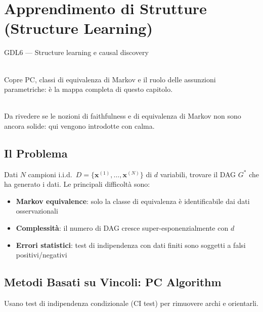 \chapter{Apprendimento di Strutture (Structure Learning)}
\label{ch:structure_learning}

\begin{risorsevideo}{GDL6 — Structure learning e causal discovery}

\medskip
{}\\
Copre PC, classi di equivalenza di Markov e il ruolo delle assunzioni parametriche: è la mappa completa di questo capitolo.

\medskip
{}\\
Da rivedere se le nozioni di faithfulness e di equivalenza di Markov non sono ancora solide: qui vengono introdotte con calma.
\end{risorsevideo}

\section{Il Problema}

Dati $N$ campioni i.i.d.\ $D = \{\mathbf{x}^{(1)}, \ldots, \mathbf{x}^{(N)}\}$ di $d$ variabili, trovare il DAG $G^*$ che ha generato i dati. Le principali difficoltà sono:

\begin{itemize}
    \item \textbf{Markov equivalence}: solo la classe di equivalenza è identificabile dai dati osservazionali
    \item \textbf{Complessità}: il numero di DAG cresce super-esponenzialmente con $d$
    \item \textbf{Errori statistici}: test di indipendenza con dati finiti sono soggetti a falsi positivi/negativi
\end{itemize}

\section{Metodi Basati su Vincoli: PC Algorithm}

Usano test di indipendenza condizionale (CI test) per rimuovere archi e orientarli.


